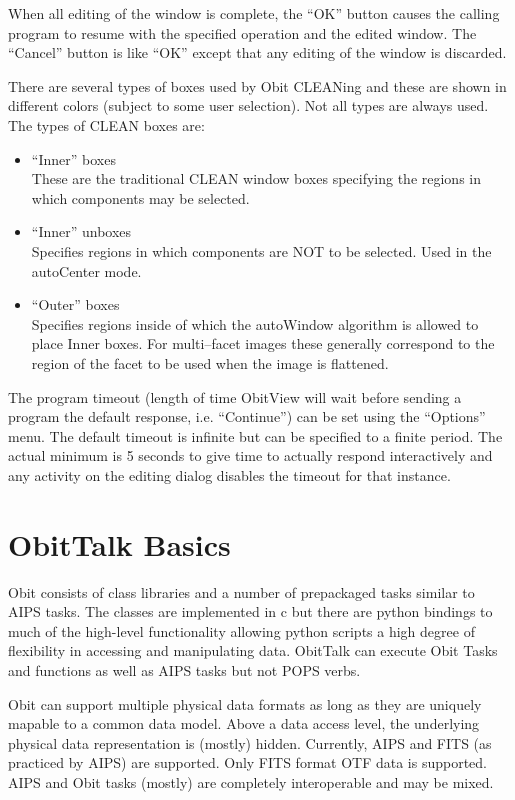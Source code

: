 \documentclass[11pt]{report}
\begin{document}
When all editing of the window is complete, the ``OK'' button causes the
calling program to resume with the specified operation and the edited
window.
The ``Cancel'' button is like ``OK'' except that any editing of the
window is discarded.

There are several types of boxes used by Obit CLEANing and these are
shown in different colors (subject to some user selection).
Not all types are always used.
The types of CLEAN boxes are:
\begin{itemize}
\item ``Inner'' boxes \\
These are the traditional CLEAN window boxes specifying the regions in
which components may be selected.
\item ``Inner'' unboxes \\
Specifies regions in which components are NOT to be selected.
Used in the autoCenter mode.
\item ``Outer'' boxes \\
Specifies regions inside of which the autoWindow algorithm is allowed
to place Inner boxes.
For multi--facet images these generally correspond to the region of
the facet to be used when the image is flattened.
\end{itemize}

The program timeout (length of time ObitView will wait before sending
a program the default response, i.e. ``Continue'') can be set using
the ``Options'' menu.
The default timeout is infinite but can be specified to a finite
period.
The actual minimum is 5 seconds to give time to actually respond
interactively and any activity on the editing dialog disables the
timeout for that instance.

\section {ObitTalk Basics}
   Obit consists of class libraries and a number of prepackaged
tasks similar to AIPS tasks.  The classes are implemented in c but
there are python bindings to much of the high-level functionality
allowing python scripts a high degree of flexibility in accessing
and manipulating data.
ObitTalk can execute Obit Tasks and functions as well as AIPS tasks
but not POPS verbs.

   Obit can support multiple physical data formats as long as they are
uniquely mapable to a common data model.  Above a data access level,
the underlying physical data representation is (mostly) hidden.
Currently, AIPS and FITS (as practiced by AIPS) are supported.
Only FITS format OTF data is supported.
AIPS and Obit tasks (mostly) are completely interoperable and may be
mixed.
\end{document}
